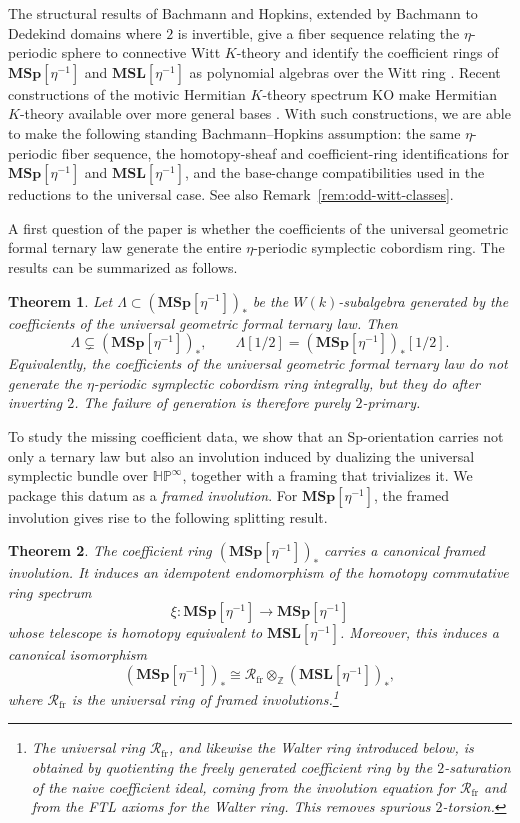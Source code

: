 \documentclass[a4paper]{amsart}
\theoremstyle{plain}
\newtheorem*{theorem*}{Theorem}
\theoremstyle{definition}
\newcommand{\Sp}{\mathrm{Sp}}
\newcommand{\MSp}{\mathbf{MSp}}
\newcommand{\MSL}{\mathbf{MSL}}
\newcommand{\etainv}{\eta^{-1}}
\newcommand{\MSpetainv}{{\MSp[\etainv]}}
\newcommand{\MSLetainv}{{\MSL[\etainv]}}
\newcommand{\HP}{\mathbb{HP}}
\newcommand{\HPinf}{\HP^{\infty}}
\newcommand{\KO}{\mathrm{KO}}
\newcommand{\ZZ}{\mathbb{Z}}
\newcommand{\Rfr}{\mathcal{R}_{\mathrm{fr}}}
\begin{document}
The structural results of Bachmann and Hopkins, extended by Bachmann to Dedekind domains where $2$ is invertible, give a fiber sequence relating the $\eta$-periodic sphere to connective Witt $K$-theory and identify the coefficient rings of $\MSpetainv$ and $\MSLetainv$ as polynomial algebras over the Witt ring \cite{bachmann2021eta,bachmann2022eta}. Recent constructions of the motivic Hermitian $K$-theory spectrum $\KO$ make Hermitian $K$-theory available over more general bases \cite{calmes2024a,kumar2024construction}. With such constructions, we are able to make the following standing Bachmann--Hopkins assumption: the same $\eta$-periodic fiber sequence, the homotopy-sheaf and coefficient-ring identifications for $\MSpetainv$ and $\MSLetainv$, and the base-change compatibilities used in the reductions to the universal case. See also Remark~\ref{rem:odd-witt-classes}.

A first question of the paper is whether the coefficients of the universal geometric formal ternary law generate the entire $\eta$-periodic symplectic cobordism ring. The results can be summarized as follows.

\begin{theorem*}
	Let $\Lambda \subset (\MSpetainv)_*$ be the $W(k)$-subalgebra generated by the coefficients of the universal geometric formal ternary law. Then
	\[
		\Lambda \subsetneq (\MSpetainv)_*,
		\qquad
		\Lambda[1/2]=(\MSpetainv)_*[1/2].
	\]
	Equivalently, the coefficients of the universal geometric formal ternary law do not generate the $\eta$-periodic symplectic cobordism ring integrally, but they do after inverting $2$. The failure of generation is therefore purely $2$-primary.
\end{theorem*}

To study the missing coefficient data, we show that an $\Sp$-orientation carries not only a ternary law but also an involution induced by dualizing the universal symplectic bundle over $\HPinf$, together with a framing that trivializes it. We package this datum as a \emph{framed involution}. For $\MSpetainv$, the framed involution gives rise to the following splitting result.

\begin{theorem*}
	The coefficient ring $(\MSpetainv)_*$ carries a canonical framed involution. It induces an idempotent endomorphism of the homotopy commutative ring spectrum
	\[
		\xi:\MSpetainv\to \MSpetainv
	\]
	whose telescope is homotopy equivalent to $\MSLetainv$. Moreover, this induces a canonical isomorphism
	\[
		(\MSpetainv)_* \cong \Rfr \otimes_{\ZZ} (\MSLetainv)_*,
	\]
	where $\Rfr$ is the universal ring of framed involutions.\footnote{The universal ring $\Rfr$, and likewise the Walter ring introduced below, is obtained by quotienting the freely generated coefficient ring by the $2$-saturation of the naive coefficient ideal, coming from the involution equation for $\Rfr$ and from the FTL axioms for the Walter ring. This removes spurious $2$-torsion.}
\end{theorem*}
\end{document}
